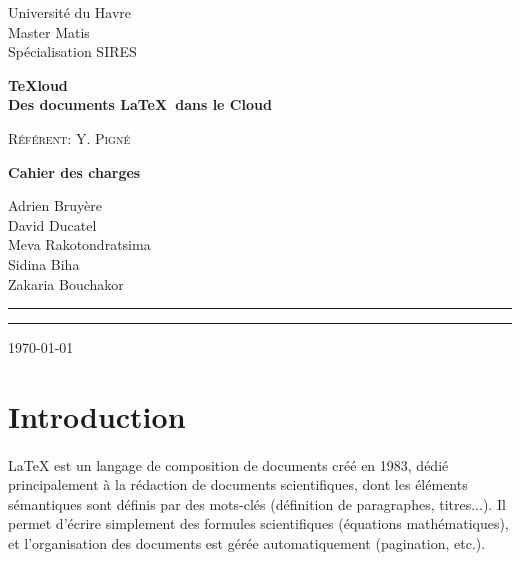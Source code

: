 \documentclass[a4paper,12pt]{article}
\begin{document}

\begin{titlepage}
\begin{flushleft}
\large{Universit\'e du Havre \\
Master Matis \\
Sp\'ecialisation SIRES\\
}
\end{flushleft}

\setlength{\parskip}{96pt}

\begin{center}
\huge\textbf{TeXloud\\Des documents \LaTeX ~dans le Cloud}

\setlength{\parskip}{18pt}
\large\textsc{Référent: Y. Pigné}

\setlength{\parskip}{70pt}

\Large\textbf{Cahier des charges}

\setlength{\parskip}{50pt}

\large Adrien Bruyère\\David Ducatel\\Meva Rakotondratsima\\Sidina Biha\\Zakaria Bouchakor
\end{center}
\setlength{\parskip}{50pt}
\begin{flushleft}
\rule{.4mm}{26mm}\rule{105mm}{.4mm}
\today
\end{flushleft}
\end{titlepage}

 
\clearpage

\tableofcontents

\newpage

\section{Introduction}
\paragraph*{}
LaTeX est un langage de composition de documents créé en 1983, dédié principalement à la rédaction
 de documents scientifiques, dont les éléments sémantiques sont définis par des mots-clés 
(définition de paragraphes, titres...). Il permet d'écrire simplement des formules scientifiques 
(équations mathématiques), et l'organisation des documents est gérée automatiquement (pagination, 
etc.).
\end{document}
